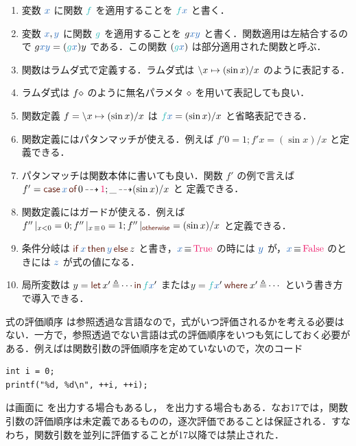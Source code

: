 \documentclass[a5paper,twoside,fleqn,draft]{jsbook}
\begin{document}
\begin{enumerate}
\item 変数 $\hVar{x}$ に関数 $\hFunc{f}$ を適用することを $\hFunc{f}\hVar{x}$ と書く．\item 変数 $\hVar{x},\hVar{y}$ に関数 $\hFunc{g}$ を適用することを $g\hVar{x}\hVar{y}$ と書く．関数適用は左結合するので $g\hVar{x}\hVar{y}=(\hFunc{g}\hVar{x})y$ である．この関数 $(\hFunc{g}\hVar{x})$ は部分適用された関数と呼ぶ．
\item 関数はラムダ式で定義する．ラムダ式は $\backslash x\mapsto(\sin x)/x$ のように表記する．\item ラムダ式は $f\diamond$ のように無名パラメタ $\diamond$ を用いて表記しても良い．\item 関数定義 $f=\backslash x\mapsto(\sin x)/x$ は $\hFunc{f}\hVar{x}=(\sin x)/x$ と省略表記できる．
\item 関数定義にはパタンマッチが使える．例えば $f'0=1;f'x=(\sin x)/x$ と定義できる．\item パタンマッチは関数本体に書いても良い．関数 $f'$ の例で言えば $f'=\hCaseSyntax{\hVar{x}}0\hIfSo\hConstant{1};\_\hIfSo(\sin x)/x$ と 定義できる．\item 関数定義にはガードが使える．例えば $f''\hGuard{x<0}=0;f''\hGuard{x\hIfEq0}=1;f''\hGuard{\hOtherwise}=(\sin x)/x$ と定義できる．\item 条件分岐は $\mIfThenElseEXP{\hVar{x}}{\hVar{y}}{z}$ と書き，$\hVar{x}\hIfEq\hTrue$ の時には $\hVar{y}$ が，$\hVar{x}\hIfEq\hFalse$ のときには $\hVar{z}$ が式の値になる．\item 局所変数は $y=\mLetInEXP{x'}{\dotsb}{\hFunc{f}\hVar{x}'}$ または$y=\hFunc{f}\hVar{x}'\mWhereIsEXP{x'}{\dotsb}$ という書き方で導入できる．
\end{enumerate}


\begin{note}{式の評価順序}
\haskell は参照透過な言語なので，式がいつ評価されるかを考える必要はない．一方で，参照透過でない言語は式の評価順序をいつも気にしておく必要がある．例えば\clang は関数引数の評価順序を定めていないので，次のコード
\begin{ccode}
\begin{verbatim}
int i = 0;
printf("%d, %d\n", ++i, ++i);
\end{verbatim}
\end{ccode}
は画面に  を出力する場合もあるし， を出力する場合もある．なお\cxx17では，関数引数の評価順序は未定義であるものの，逐次評価であることは保証される．すなわち，関数引数を並列に評価することが\cxx17以降では禁止された．
\end{note}
\end{document}
